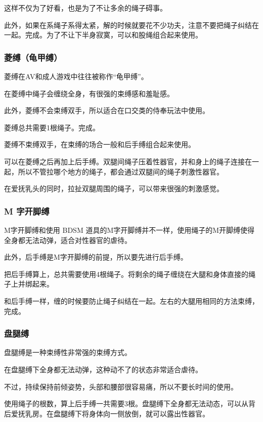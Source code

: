 \documentclass[12pt,UTF8]{ctexbook}
\begin{document}
这样不仅为了好看，也是为了不让多余的绳子碍事。

此外，如果在系绳子系得太紧，解的时候就要花不少功夫，注意不要把绳子纠结在一起。完成。为了不让下半身寂寞，可以和股绳组合起来使用。

\subsubsection{菱缚（龟甲缚）}

菱缚在AV和成人游戏中往往被称作“龟甲缚”。

在菱缚中绳子会缠绕全身，有很强的束缚感和羞耻感。

此外，菱缚不会束缚双手，所以适合在口交类的侍奉玩法中使用。

菱缚总共需要1根绳子。完成。

菱缚不束缚双手，在束缚的场合一般和后手缚组合起来使用。

可以在菱缚之后再加上后手缚。双腿间绳子压着性器官，并和身上的绳子连接在一起，所以不管拉哪个地方的绳子，都会通过双腿间的绳子刺激性器官。

在爱抚乳头的同时，拉扯双腿周围的绳子，可以带来很强的刺激感觉。 

\subsubsection{M 字开脚缚}

M字开脚缚和使用 BDSM 道具的M字开脚缚并不一样，使用绳子的M开脚缚使得全身都无法动弹，适合对性器官的虐待。

此外，后手缚是M字开脚缚的前提，所以要先进行后手缚。

把后手缚算上，总共需要使用4根绳子。将剩余的绳子缠绕在大腿和身体直接的绳子上并绑起来。

和后手缚一样，缠的时候要防止绳子纠结在一起。左右的大腿用相同的方法束缚，完成。

\subsubsection{盘腿缚}

盘腿缚是一种束缚性非常强的束缚方式。

在盘腿缚下全身都无法动弹，这种动不了的状态非常适合虐待。

不过，持续保持前倾姿势，头部和腰部很容易痛，所以不要长时间的使用。

使用绳子的根数，算上后手缚一共需要3根。盘腿缚下全身都无法动态，可以从背后爱抚乳房。在盘腿缚下将身体向一侧放倒，就可以露出性器官。
\end{document}
